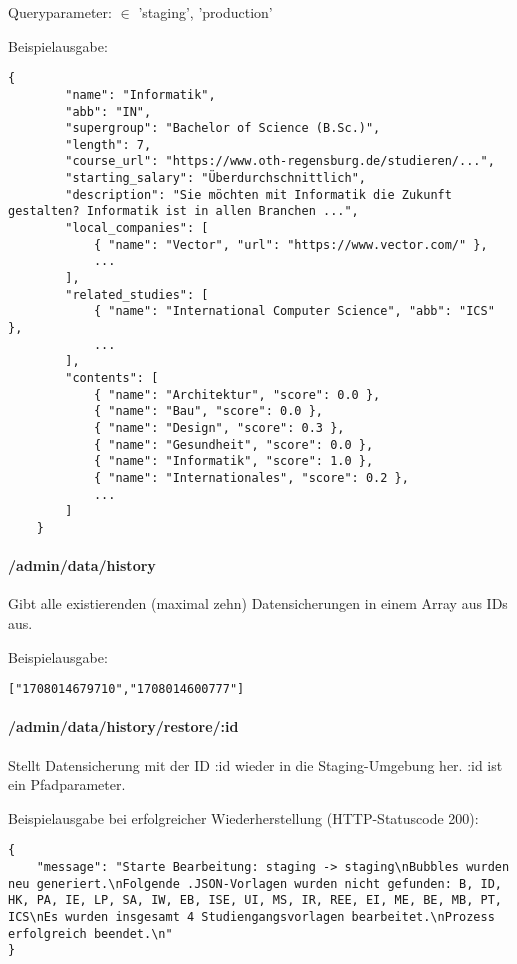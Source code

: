 \noindent
Queryparameter:  $\in$ {'staging', 'production'}

\noindent
Beispielausgabe:

\begin{lstlisting}[style=Python]
    {
        "name": "Informatik",
        "abb": "IN",
        "supergroup": "Bachelor of Science (B.Sc.)",
        "length": 7,
        "course_url": "https://www.oth-regensburg.de/studieren/...",
        "starting_salary": "Überdurchschnittlich",
        "description": "Sie möchten mit Informatik die Zukunft gestalten? Informatik ist in allen Branchen ...",
        "local_companies": [
            { "name": "Vector", "url": "https://www.vector.com/" },
            ...
        ],
        "related_studies": [
            { "name": "International Computer Science", "abb": "ICS" },
            ...
        ],
        "contents": [
            { "name": "Architektur", "score": 0.0 },
            { "name": "Bau", "score": 0.0 },
            { "name": "Design", "score": 0.3 },
            { "name": "Gesundheit", "score": 0.0 },
            { "name": "Informatik", "score": 1.0 },
            { "name": "Internationales", "score": 0.2 },
            ...
        ]
    }
\end{lstlisting}

\paragraph*{/admin/data/history}
\vspace{-1.0em}
Gibt alle existierenden (maximal zehn) Datensicherungen in einem Array aus IDs aus.

\noindent
Beispielausgabe:
\begin{lstlisting}[style=Python]
    ["1708014679710","1708014600777"]
\end{lstlisting}

\paragraph*{/admin/data/history/restore/:id}
\vspace{-1.0em}
Stellt Datensicherung mit der ID :id wieder in die Staging-Umgebung her. :id ist ein Pfadparameter.

\noindent
Beispielausgabe bei erfolgreicher Wiederherstellung (HTTP-Statuscode 200):
\begin{lstlisting}[style=Python]
{
    "message": "Starte Bearbeitung: staging -> staging\nBubbles wurden neu generiert.\nFolgende .JSON-Vorlagen wurden nicht gefunden: B, ID, HK, PA, IE, LP, SA, IW, EB, ISE, UI, MS, IR, REE, EI, ME, BE, MB, PT, ICS\nEs wurden insgesamt 4 Studiengangsvorlagen bearbeitet.\nProzess erfolgreich beendet.\n"
}
\end{lstlisting}

